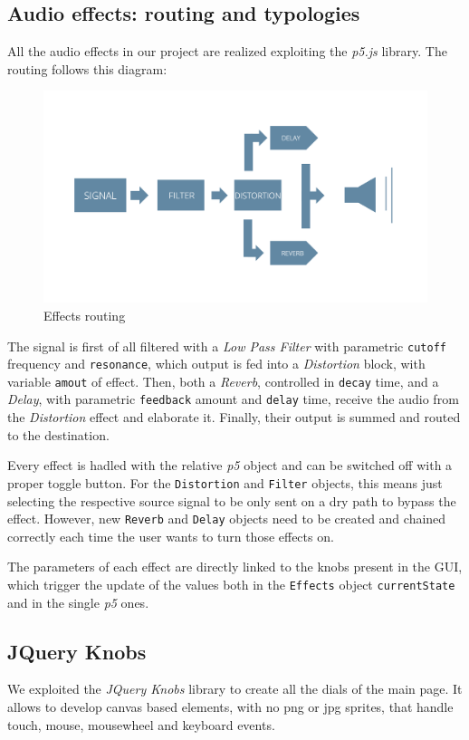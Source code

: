 \documentclass[12pt, a4paper]{article}
\begin{document}
\subsection{Audio effects: routing and typologies}
All the audio effects in our project are realized exploiting the \emph{p5.js} library. The routing follows this diagram:
\begin{figure}[h]
    \centering
    \includegraphics[scale=0.4]{effects.png}
    \caption{Effects routing}  
\end{figure}

The signal is first of all filtered with a \emph{Low Pass Filter} with parametric \texttt{cutoff} frequency and \texttt{resonance}, which output is fed into a \emph{Distortion} block, with variable \texttt{amout} of effect. Then, both a \emph{Reverb}, controlled in \texttt{decay} time, and a \emph{Delay}, with parametric \texttt{feedback} amount and \texttt{delay} time, receive the audio from the \emph{Distortion} effect and elaborate it. Finally, their output is summed and routed to the destination.

Every effect is hadled with the relative \emph{p5} object and can be switched off with a proper toggle button. For the \texttt{Distortion} and \texttt{Filter} objects, this means just selecting the respective source signal to be only sent on a dry path to bypass the effect. However, new \texttt{Reverb} and \texttt{Delay} objects need to be created and chained correctly each time the user wants to turn those effects on. 

The parameters of each effect are directly linked to the knobs present in the GUI, which trigger the update of the values both in the \texttt{Effects} object \texttt{currentState} and in the single \emph{p5} ones.

\subsection{JQuery Knobs}
We exploited the \emph{JQuery Knobs} library to create all the dials of the main page. It allows to develop canvas based elements, with no png or jpg sprites, that handle touch, mouse, mousewheel and keyboard events.
\end{document}
